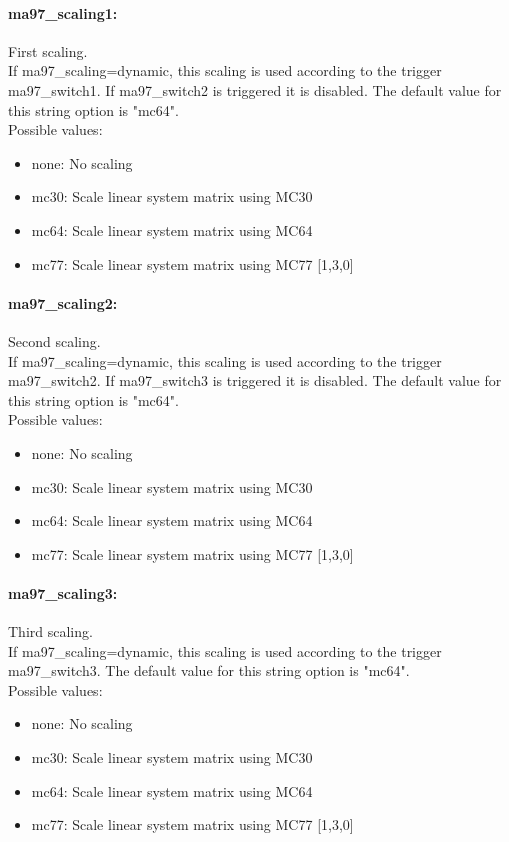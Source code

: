 \paragraph{ma97\_scaling1:}\label{opt:ma97_scaling1} First scaling. \\
 If ma97\_scaling=dynamic, this scaling is used according to the trigger ma97\_switch1. If ma97\_switch2 is triggered it is disabled. The default value for this string option is "mc64".
\\ 
Possible values:
\begin{itemize}
   \item none: No scaling
   \item mc30: Scale linear system matrix using MC30
   \item mc64: Scale linear system matrix using MC64
   \item mc77: Scale linear system matrix using MC77 [1,3,0]
\end{itemize}

\paragraph{ma97\_scaling2:}\label{opt:ma97_scaling2} Second scaling. \\
 If ma97\_scaling=dynamic, this scaling is used according to the trigger ma97\_switch2. If ma97\_switch3 is triggered it is disabled. The default value for this string option is "mc64".
\\ 
Possible values:
\begin{itemize}
   \item none: No scaling
   \item mc30: Scale linear system matrix using MC30
   \item mc64: Scale linear system matrix using MC64
   \item mc77: Scale linear system matrix using MC77 [1,3,0]
\end{itemize}

\paragraph{ma97\_scaling3:}\label{opt:ma97_scaling3} Third scaling. \\
 If ma97\_scaling=dynamic, this scaling is used according to the trigger ma97\_switch3. The default value for this string option is "mc64".
\\ 
Possible values:
\begin{itemize}
   \item none: No scaling
   \item mc30: Scale linear system matrix using MC30
   \item mc64: Scale linear system matrix using MC64
   \item mc77: Scale linear system matrix using MC77 [1,3,0]
\end{itemize}


